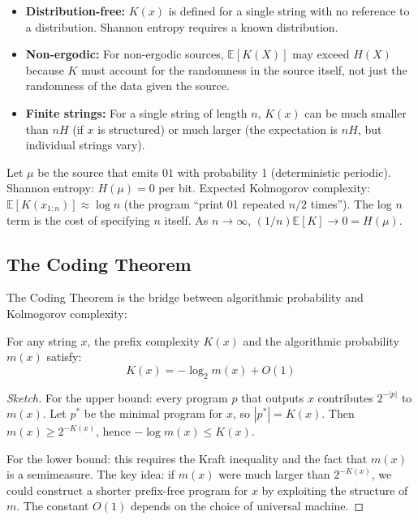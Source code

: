 \begin{itemize}
\item \textbf{Distribution-free:} $K(x)$ is defined for a single string with no reference to a distribution. Shannon entropy requires a known distribution.
\item \textbf{Non-ergodic:} For non-ergodic sources, $\mathbb{E}[K(X)]$ may exceed $H(X)$ because $K$ must account for the randomness in the source itself, not just the randomness of the data given the source.
\item \textbf{Finite strings:} For a single string of length $n$, $K(x)$ can be much smaller than $n H$ (if $x$ is structured) or much larger (the expectation is $nH$, but individual strings vary).
\end{itemize}

\begin{example}
Let $\mu$ be the source that emits $01$ with probability 1 (deterministic periodic). Shannon entropy: $H(\mu) = 0$ per bit. Expected Kolmogorov complexity: $\mathbb{E}[K(x_{1:n})] \approx \log n$ (the program ``print 01 repeated $n/2$ times''). The log $n$ term is the cost of specifying $n$ itself. As $n\to\infty$, $(1/n)\mathbb{E}[K] \to 0 = H(\mu)$.
\end{example}

\subsection{The Coding Theorem}
\label{sec:kolmogorov:coding}

The Coding Theorem is the bridge between algorithmic probability and Kolmogorov complexity:

\begin{theorem}
For any string $x$, the prefix complexity $K(x)$ and the algorithmic probability $m(x)$ satisfy:
\[
K(x) = -\log_2 m(x) + O(1)
\]
\end{theorem}

\begin{proof}[Sketch]
For the upper bound: every program $p$ that outputs $x$ contributes $2^{-|p|}$ to $m(x)$. Let $p^*$ be the minimal program for $x$, so $|p^*| = K(x)$. Then $m(x) \ge 2^{-K(x)}$, hence $-\log m(x) \le K(x)$. 

For the lower bound: this requires the Kraft inequality and the fact that $m(x)$ is a semimeasure. The key idea: if $m(x)$ were much larger than $2^{-K(x)}$, we could construct a shorter prefix-free program for $x$ by exploiting the structure of $m$. The constant $O(1)$ depends on the choice of universal machine.
\end{proof}

